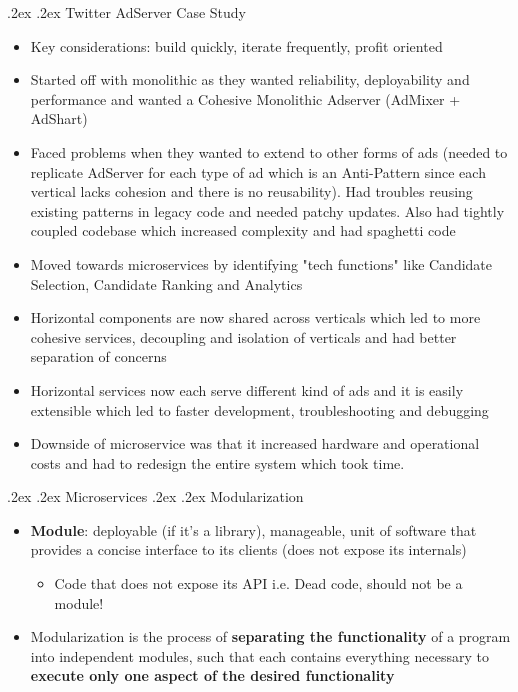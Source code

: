 \documentclass[10pt,landscape,a4paper]{article}
\makeatletter
\renewcommand{\section}{\@startsection{section}{1}{0mm}%
	{.2ex}%
	{.2ex}%
	{\color{myblue}\sffamily\scriptsize\bfseries}}
\renewcommand{\subsection}{\@startsection{subsection}{1}{0mm}%
	{.2ex}%
	{.2ex}%
	{\sffamily\bfseries}}
\makeatother
\begin{document}
\begin{multicols*}{4}
		\subsection{Twitter AdServer Case Study}
		\begin{itemize}
			\item Key considerations: build quickly, iterate frequently, profit oriented
			\item Started off with monolithic as they wanted reliability, deployability and performance and wanted a Cohesive Monolithic Adserver (AdMixer + AdShart)
			\item Faced problems when they wanted to extend to other forms of ads (needed to replicate AdServer for each type of ad which is an Anti-Pattern since each vertical lacks cohesion and there is no reusability). Had troubles reusing existing patterns in legacy code and needed patchy updates. Also had tightly coupled codebase which increased complexity and had spaghetti code
			\item Moved towards microservices by identifying "tech functions" like Candidate Selection, Candidate Ranking and Analytics
			\item Horizontal components are now shared across verticals which led to more cohesive services, decoupling and isolation of verticals and had better separation of concerns
			\item Horizontal services now each serve different kind of ads and it is easily extensible which led to faster development, troubleshooting and debugging
			\item Downside of microservice was that it increased hardware and operational costs and had to redesign the entire system which took time. 
		\end{itemize}
		\section{Microservices}
		\subsection{Modularization}
		\begin{itemize}
			\item \textbf{Module}: deployable (if it's a library), manageable, unit of software that provides a concise interface to its clients (does not expose its internals)
			\begin{itemize}
				\item Code that does not expose its API i.e. Dead code, should not be a module!
			\end{itemize}
			\item Modularization is the process of \textbf{separating the  functionality} of a program into independent modules, such that each contains everything necessary to \textbf{execute only one aspect of the desired functionality}
		\end{itemize}

\end{multicols*}
\end{document}

